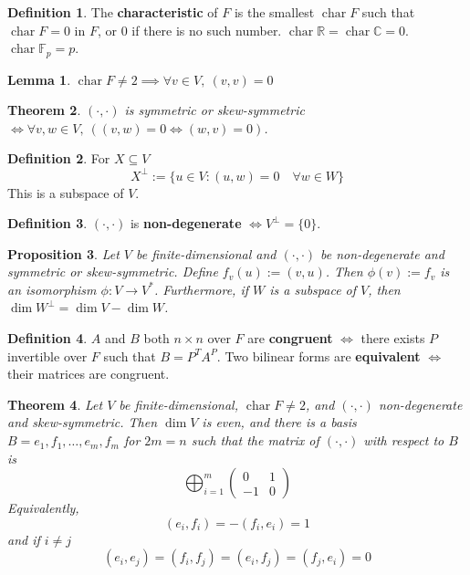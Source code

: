 \documentclass[12pt]{article}
\newtheorem{thm}{Theorem}[section]
\newtheorem{lem}[thm]{Lemma}
\newtheorem{prop}[thm]{Proposition}
\theoremstyle{definition}
\newtheorem*{defn*}{Definition}
\DeclareMathOperator{\chr}{char}
\begin{document}
\begin{defn*}
	The \textbf{characteristic} of $F$ is the smallest $\chr{F}$ such that $\chr{F} = 0$ in $F$, or 0 if there is no such number.
	$\chr{\mathbb{R}} = \chr{\mathbb{C}} = 0$.
	$\chr{\mathbb{F}_p} = p$.
\end{defn*}

\begin{lem}
	$\chr{F} \neq 2 \implies \forall v \in V,\ (v, v) = 0$
\end{lem}

\begin{thm}
	$(\cdot, \cdot)$ is symmetric or skew-symmetric $\iff \forall v, w \in V,\ ((v, w) = 0 \iff (w, v) = 0)$.
\end{thm}

\begin{defn*}
	For $X \subseteq V$
	$$X^{\bot} := \{u \in V : (u, w) = 0\quad \forall w \in W\}$$
	This is a subspace of $V$.
\end{defn*}

\begin{defn*}
	$(\cdot, \cdot)$ is \textbf{non-degenerate} $\iff V^{\bot} = \{0\}$.
\end{defn*}

\begin{prop}
	Let $V$ be finite-dimensional and $(\cdot, \cdot)$ be non-degenerate and symmetric or skew-symmetric.
	Define $f_v(u) := (v, u)$.
	Then $\phi(v) := f_v$ is an isomorphism $\phi : V \to V^{\ast}$.
	Furthermore, if $W$ is a subspace of $V$, then $\dim{W^{\bot}} = \dim{V} - \dim{W}$.
\end{prop}

\begin{defn*}
	$A$ and $B$ both $n \times n$ over $F$ are \textbf{congruent} $\iff$ there exists $P$ invertible over $F$ such that $B = P^TA^P$.
	Two bilinear forms are \textbf{equivalent} $\iff$ their matrices are congruent.
\end{defn*}

\begin{thm}
	Let $V$ be finite-dimensional, $\chr{F} \neq 2$, and $(\cdot, \cdot)$ non-degenerate and skew-symmetric.
	Then $\dim{V}$ is even, and there is a basis $B = {e_1, f_1, \ldots, e_m, f_m}$ for $2m = n$ such that the matrix of $(\cdot, \cdot)$ with respect to $B$ is
	$$\bigoplus_{i = 1}^m\begin{pmatrix} 0 & 1 \\ -1 & 0 \end{pmatrix}$$
	Equivalently,
	$$(e_i, f_i) = -(f_i, e_i) = 1$$
	and if $i \neq j$
	$$(e_i, e_j) = (f_i, f_j) = (e_i, f_j) = (f_j, e_i) = 0$$
\end{thm}
\end{document}
